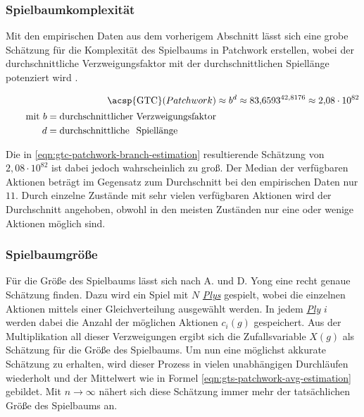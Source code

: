 \subsubsection*{Spielbaumkomplexität}

Mit den empirischen Daten aus dem vorherigem Abschnitt lässt sich eine grobe Schätzung für die Komplexität des Spielbaums in Patchwork erstellen, wobei der durchschnittliche Verzweigungsfaktor mit der durchschnittlichen Spiellänge potenziert wird \cite[S. 160]{1194.SearchAndAiInGames}.

\begin{align}
    \label{eqn:gtc-patchwork-branch-estimation}
    \text{\acsp{GTC}}(Patchwork) & \approx b^d \approx {83{,}6593}^{42{,}8176} \approx 2{,}08 \cdot 10^{82} \\[2pt]
    \tag*{$\text{mit }           b = \text{durchschnittlicher Verzweigungsfaktor}$}                         \\
    \tag*{$\phantom{\text{mit }} d = \text{durchschnittliche\phantom{r} \rlap{Spiellänge}\phantom{Verzweigungsfaktor}}$}
\end{align}

Die in \ref{eqn:gtc-patchwork-branch-estimation} resultierende Schätzung von $2{,}08 \cdot 10^{82}$ ist dabei jedoch wahrscheinlich zu groß. Der Median der verfügbaren Aktionen beträgt im Gegensatz zum Durchschnitt bei den empirischen Daten nur $11$. Durch einzelne Zustände mit sehr vielen verfügbaren Aktionen wird der Durchschnitt angehoben, obwohl in den meisten Zuständen nur eine oder wenige Aktionen möglich sind.

\subsubsection*{Spielbaumgröße}

Für die Größe des Spielbaums lässt sich nach A. und D. Yong eine recht genaue Schätzung finden. Dazu wird ein Spiel mit $N$ \hyperref[text:ply]{\emph{Plys}} gespielt, wobei die einzelnen Aktionen mittels einer Gleichverteilung ausgewählt werden. In jedem \hyperref[text:ply]{\emph{Ply}} $i$ werden dabei die Anzahl der möglichen Aktionen $c_i(g)$ gespeichert. Aus der Multiplikation all dieser Verzweigungen ergibt sich die Zufallsvariable $X(g)$ als Schätzung für die Größe des Spielbaums. Um nun eine möglichst akkurate Schätzung zu erhalten, wird dieser Prozess in vielen unabhängigen Durchläufen wiederholt und der Mittelwert wie in Formel \ref{eqn:gts-patchwork-avg-estimation} gebildet. Mit $n \to \infty$ nähert sich diese Schätzung immer mehr der tatsächlichen Größe des Spielbaums an. \cite{2019.GameTreeComplexityEstimation}

